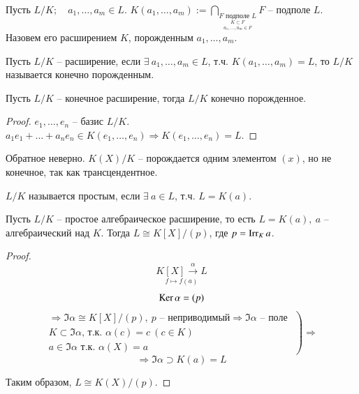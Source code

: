 \documentclass[main]{subfiles}
\begin{document}
\begin{definition}
    Пусть $L / K ; \quad a_1, \ldots, a_m \in L$. 
    $K(a_1, \ldots, a_m) := \bigcap_{\underset{a_1, \ldots, a_m \in F}{\underset{K \subset F}{F \text{ подполе } L}}} F
    \text{ -- подполе } L$.
    Назовем его расширением $K$, порожденным $a_1, \ldots, a_m$.
\end{definition}

\begin{definition}
    Пусть $L / K$ -- расширение, если $\exists \ a_1, \ldots, a_m \in L$, т.ч.
    $K(a_1, \ldots, a_m) = L$, то $L / K $ называется конечно порожденным.
\end{definition}

\begin{proposition}
    Пусть $L / K$ -- конечное  расширение, тогда $L / K$ конечно порожденное.
\end{proposition}

\begin{proof}
    $e_1, \ldots , e_n$ -- базис $L/K$. $a_1e_1 + \ldots + a_ne_n \in  K(e_1, \ldots, e_n)  \Rightarrow K(e_1, \ldots, e_n) = L$.
\end{proof}

\begin{remark}
    Обратное неверно. $K(X) / K$ -- порождается одним элементом $(x)$, но не конечное, так как трансцендентное.
\end{remark}

\begin{definition}
    $L / K$ называется простым, если $\exists \ a \in L$, т.ч. $L = K(a)$.
\end{definition}

\begin{proposition}
    Пусть $L / K$ -- простое алгебраическое расширение, то есть $L = K(a), \ a$ -- алгебраический над $K$.
    Тогда $L \cong K[X] / (p)$, где $p = \operatorname{Irr}_K a$.
\end{proposition}

\begin{proof}
    \[ \underset{f \mapsto f(a)}{K[X] \stackrel{\alpha}{\longrightarrow}L}  \]
    \[ \operatorname{Ker} \alpha = (p) \] 
    \[  \left. \begin{gathered}
        \Rightarrow \Im \alpha \cong K[X] / (p), \ p \text{ -- неприводимый} \Rightarrow \Im \alpha \text{ -- поле } \\
        K \subset \Im \alpha \text{, т.к. } \alpha(c) = c \ (c \in K) \\
        a \in \Im \alpha \text{ т.к. } \alpha(X) = a
    \end{gathered} \right) \Rightarrow \]
    \[\Rightarrow \Im \alpha \supset K(a) = L \]
    
   Таким образом, $L \cong K(X)  / (p)$.
\end{proof}
\end{document}
